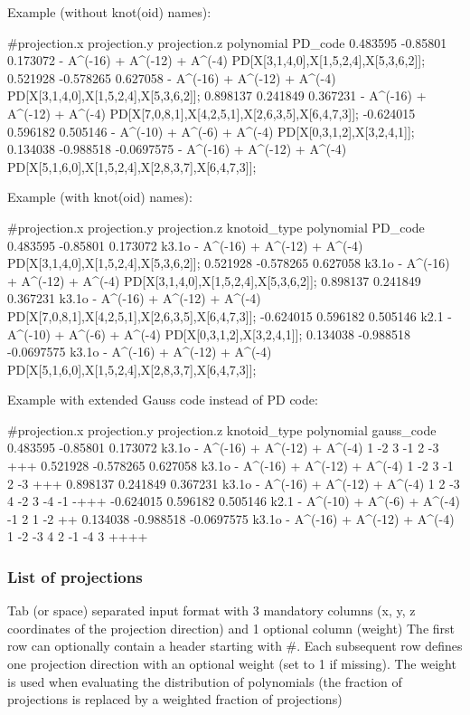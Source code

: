 Example (without knot(oid) names):
\begin{lstlistingverysmall}
#projection.x  projection.y  projection.z  polynomial                    PD_code
0.483595       -0.85801      0.173072      - A^(-16) + A^(-12) + A^(-4)  PD[X[3,1,4,0],X[1,5,2,4],X[5,3,6,2]];
0.521928       -0.578265     0.627058      - A^(-16) + A^(-12) + A^(-4)  PD[X[3,1,4,0],X[1,5,2,4],X[5,3,6,2]];
0.898137       0.241849      0.367231      - A^(-16) + A^(-12) + A^(-4)  PD[X[7,0,8,1],X[4,2,5,1],X[2,6,3,5],X[6,4,7,3]];
-0.624015      0.596182      0.505146      - A^(-10) + A^(-6) + A^(-4)   PD[X[0,3,1,2],X[3,2,4,1]];
0.134038       -0.988518     -0.0697575    - A^(-16) + A^(-12) + A^(-4)  PD[X[5,1,6,0],X[1,5,2,4],X[2,8,3,7],X[6,4,7,3]];
\end{lstlistingverysmall}
Example (with knot(oid) names):
\begin{lstlistingverysmall}
#projection.x projection.y projection.z knotoid_type polynomial                   PD_code
0.483595      -0.85801     0.173072     k3.1o       - A^(-16) + A^(-12) + A^(-4)  PD[X[3,1,4,0],X[1,5,2,4],X[5,3,6,2]];
0.521928      -0.578265    0.627058     k3.1o       - A^(-16) + A^(-12) + A^(-4)  PD[X[3,1,4,0],X[1,5,2,4],X[5,3,6,2]];
0.898137      0.241849     0.367231     k3.1o       - A^(-16) + A^(-12) + A^(-4)  PD[X[7,0,8,1],X[4,2,5,1],X[2,6,3,5],X[6,4,7,3]];
-0.624015     0.596182     0.505146     k2.1        - A^(-10) + A^(-6) + A^(-4)   PD[X[0,3,1,2],X[3,2,4,1]];
0.134038      -0.988518    -0.0697575   k3.1o       - A^(-16) + A^(-12) + A^(-4)  PD[X[5,1,6,0],X[1,5,2,4],X[2,8,3,7],X[6,4,7,3]];
\end{lstlistingverysmall}
Example with extended Gauss code instead of PD code:
\begin{lstlistingverysmall}
#projection.x projection.y projection.z knotoid_type polynomial                    gauss_code
0.483595      -0.85801     0.173072     k3.1o       - A^(-16) + A^(-12) + A^(-4)   1 -2 3 -1 2 -3 +++
0.521928      -0.578265    0.627058     k3.1o       - A^(-16) + A^(-12) + A^(-4)   1 -2 3 -1 2 -3 +++
0.898137      0.241849     0.367231     k3.1o       - A^(-16) + A^(-12) + A^(-4)   1 2 -3 4 -2 3 -4 -1 -+++
-0.624015     0.596182     0.505146     k2.1        - A^(-10) + A^(-6) + A^(-4)    -1 2 1 -2 ++
0.134038      -0.988518    -0.0697575   k3.1o       - A^(-16) + A^(-12) + A^(-4)   1 -2 -3 4 2 -1 -4 3 ++++
\end{lstlistingverysmall}


\subsubsection{\label{sec:format:projections}List of projections}
Tab (or space) separated input format with 3 mandatory columns (x, y, z coordinates of the projection direction) and 1 optional column (weight)
The first row can optionally contain a header starting with \#.
Each subsequent row defines one projection direction with an optional weight (set to 1 if missing). The weight is used when evaluating the distribution of polynomials (the fraction of projections is replaced by a weighted fraction of projections)

